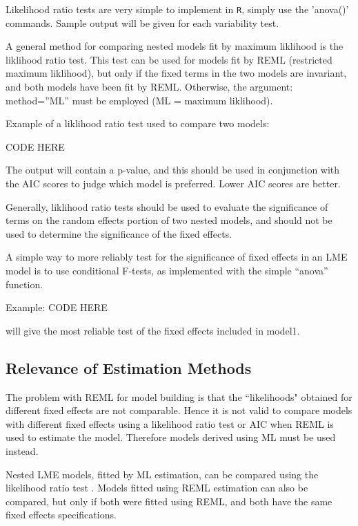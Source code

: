 \documentclass[12pt, a4paper]{article}
\begin{document}
Likelihood ratio tests are very simple to implement in \texttt{R}, simply use the 'anova()' commands. Sample output will be given for each variability test.




A general method for comparing nested models fit by maximum liklihood is the liklihood ratio 
test. This test can be used for models fit by REML (restricted maximum liklihood), but only if the 
fixed terms in the two models are invariant, and both models have been fit by REML. Otherwise, 
the argument: method=”ML” must be employed (ML = maximum liklihood). 

Example of a liklihood ratio test used to compare two models: 

CODE HERE

The output will contain a p-value, and this should be used in conjunction with the AIC scores to 
judge which model is preferred. Lower AIC scores are better. 

Generally, liklihood ratio tests should be used to evaluate the significance of terms on the 
random effects portion of two nested models, and should not be used to determine the 
significance of the fixed effects. 

A simple way to more reliably test for the significance of fixed effects in an LME model is to use 
conditional F-tests, as implemented with the simple “anova” function. 

Example: 
CODE HERE

will give the most reliable test of the fixed effects included in model1. 



	\subsection{Relevance of Estimation Methods}
	
	The problem with REML for model building is that the ``likelihoods" obtained for different fixed effects are not comparable. Hence it is not valid to compare models with different fixed effects using a likelihood ratio test or AIC when REML is used to estimate the model. Therefore models derived using ML must be used instead.
	
	
	
	Nested LME models, fitted by ML estimation, can be compared using the likelihood ratio test \citep{Lehmann2006}.
	Models fitted using REML estimation can also be compared, but only if both were fitted using REML, and both have the same fixed effects specifications.
	
\end{document}
